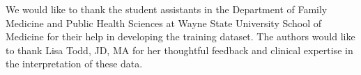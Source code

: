 

\begin{acknowledgements}
We would like to thank the student assistants in the Department of Family Medicine and Public Health Sciences at Wayne State University School of Medicine for their help in developing the training dataset. The authors would like to thank Lisa Todd, JD, MA for her thoughtful feedback and clinical expertise in the interpretation of these data.
\end{acknowledgements}




